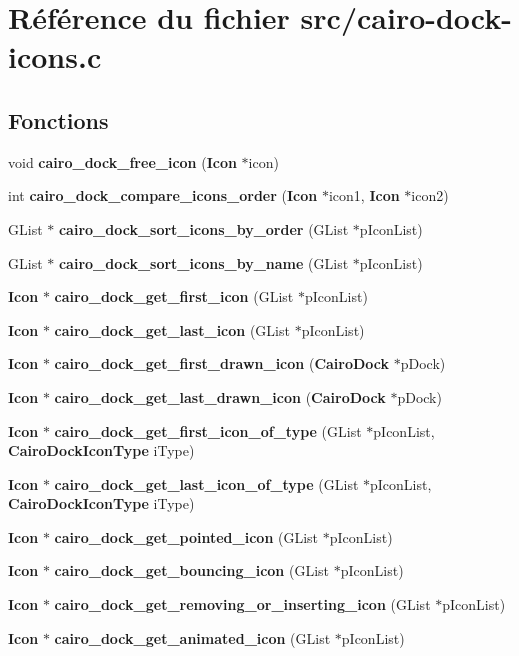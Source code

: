 \section{R\'{e}f\'{e}rence du fichier src/cairo-dock-icons.c}
\label{cairo-dock-icons_8c}
\subsection*{Fonctions}
\begin{CompactItemize}
\item 
void {\bf cairo\_\-dock\_\-free\_\-icon} ({\bf Icon} $\ast$icon)
\item 
int {\bf cairo\_\-dock\_\-compare\_\-icons\_\-order} ({\bf Icon} $\ast$icon1, {\bf Icon} $\ast$icon2)
\item 
GList $\ast$ {\bf cairo\_\-dock\_\-sort\_\-icons\_\-by\_\-order} (GList $\ast$p\-Icon\-List)
\item 
GList $\ast$ {\bf cairo\_\-dock\_\-sort\_\-icons\_\-by\_\-name} (GList $\ast$p\-Icon\-List)
\item 
{\bf Icon} $\ast$ {\bf cairo\_\-dock\_\-get\_\-first\_\-icon} (GList $\ast$p\-Icon\-List)
\item 
{\bf Icon} $\ast$ {\bf cairo\_\-dock\_\-get\_\-last\_\-icon} (GList $\ast$p\-Icon\-List)
\item 
{\bf Icon} $\ast$ {\bf cairo\_\-dock\_\-get\_\-first\_\-drawn\_\-icon} ({\bf Cairo\-Dock} $\ast$p\-Dock)
\item 
{\bf Icon} $\ast$ {\bf cairo\_\-dock\_\-get\_\-last\_\-drawn\_\-icon} ({\bf Cairo\-Dock} $\ast$p\-Dock)
\item 
{\bf Icon} $\ast$ {\bf cairo\_\-dock\_\-get\_\-first\_\-icon\_\-of\_\-type} (GList $\ast$p\-Icon\-List, {\bf Cairo\-Dock\-Icon\-Type} i\-Type)
\item 
{\bf Icon} $\ast$ {\bf cairo\_\-dock\_\-get\_\-last\_\-icon\_\-of\_\-type} (GList $\ast$p\-Icon\-List, {\bf Cairo\-Dock\-Icon\-Type} i\-Type)
\item 
{\bf Icon} $\ast$ {\bf cairo\_\-dock\_\-get\_\-pointed\_\-icon} (GList $\ast$p\-Icon\-List)
\item 
{\bf Icon} $\ast$ {\bf cairo\_\-dock\_\-get\_\-bouncing\_\-icon} (GList $\ast$p\-Icon\-List)
\item 
{\bf Icon} $\ast$ {\bf cairo\_\-dock\_\-get\_\-removing\_\-or\_\-inserting\_\-icon} (GList $\ast$p\-Icon\-List)
\item 
{\bf Icon} $\ast$ {\bf cairo\_\-dock\_\-get\_\-animated\_\-icon} (GList $\ast$p\-Icon\-List)

\end{CompactItemize}
